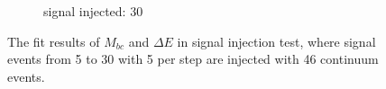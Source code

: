 \begin{figure}[htpb]
\begin{subfigure}{0.5\linewidth}
		\caption{signal injected: 30}
	\end{subfigure}
	\caption{The fit results of $M_{bc}$ and $\Delta E$ in signal injection test, where signal events from 5 to 30 with 5 per step are injected with 46 continuum events.}
	
\end{figure}